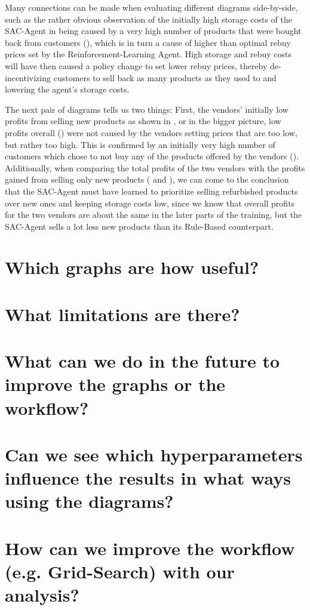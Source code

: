 Many connections can be made when evaluating different diagrams side-by-side, such as the rather obvious observation of the initially high storage costs of the SAC-Agent in  being caused by a very high number of products that were bought back from customers (), which is in turn a cause of higher than optimal rebuy prices set by the Reinforcement-Learning Agent. High storage and rebuy costs will have then caused a policy change to set lower rebuy prices, thereby de-incentivizing customers to sell back as many products as they used to and lowering the agent's storage costs.

The next pair of diagrams tells us two things: First, the vendors' initially low profits from selling new products as shown in , or in the bigger picture, low profits overall () were not caused by the vendors setting prices that are too low, but rather too high. This is confirmed by an initially very high number of customers which chose to not buy any of the products offered by the vendors (). Additionally, when comparing the total profits of the two vendors with the profits gained from selling only new products ( and ), we can come to the conclusion that the SAC-Agent must have learned to prioritize selling refurbished products over new ones and keeping storage costs low, since we know that overall profits for the two vendors are about the same in the later parts of the training, but the SAC-Agent sells a lot less new products than its Rule-Based counterpart.

\section*{Which graphs are how useful?}
\section*{What limitations are there?}
\section*{What can we do in the future to improve the graphs or the workflow?}
\section*{Can we see which hyperparameters influence the results in what ways using the diagrams?}
\section*{How can we improve the workflow (e.g. Grid-Search) with our analysis?}

